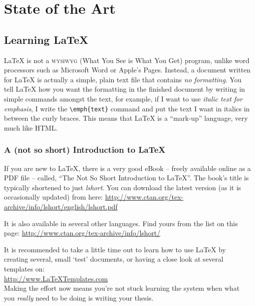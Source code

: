 
\chapter{State of the Art} 

\label{chap:Chapter2}


\section{Learning \LaTeX{}}

\LaTeX{} is not a \textsc{wysiwyg} (What You See is What You Get) program, unlike word processors such as Microsoft Word or Apple's Pages. Instead, a document written for \LaTeX{} is actually a simple, plain text file that contains \emph{no formatting}. You tell \LaTeX{} how you want the formatting in the finished document by writing in simple commands amongst the text, for example, if I want to use \emph{italic text for emphasis}, I write the \verb|\emph{text}| command and put the text I want in italics in between the curly braces. This means that \LaTeX{} is a \enquote{mark-up} language, very much like HTML.

\subsection{A (not so short) Introduction to \LaTeX{}}

If you are new to \LaTeX{}, there is a very good eBook -- freely available online as a PDF file -- called, \enquote{The Not So Short Introduction to \LaTeX{}}. The book's title is typically shortened to just \emph{lshort}. You can download the latest version (as it is occasionally updated) from here:
\url{http://www.ctan.org/tex-archive/info/lshort/english/lshort.pdf}

It is also available in several other languages. Find yours from the list on this page: \url{http://www.ctan.org/tex-archive/info/lshort/}

It is recommended to take a little time out to learn how to use \LaTeX{} by creating several, small `test' documents, or having a close look at several templates on:\\ 
\url{http://www.LaTeXTemplates.com}\\ 
Making the effort now means you're not stuck learning the system when what you \emph{really} need to be doing is writing your thesis.

